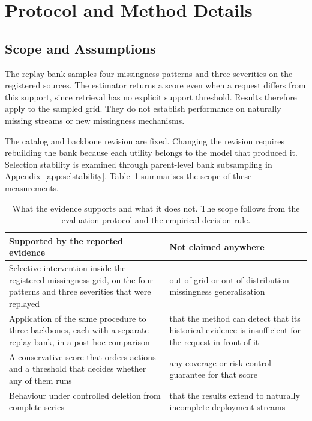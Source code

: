 \documentclass{article}
\begin{document}
\section{Protocol and Method Details}
\label{app:protocol}
\subsection{Scope and Assumptions}
\label{app:scope}
The replay bank samples four missingness patterns and three severities on the registered
sources. The estimator returns a score even when a request differs from this support, since
retrieval has no explicit support threshold. Results therefore apply to the sampled grid.
They do not establish performance on naturally missing streams or new missingness mechanisms.

The catalog and backbone revision are fixed. Changing the revision requires rebuilding the
bank because each utility belongs to the model that produced it. Selection stability is
examined through parent-level bank subsampling in Appendix~\ref{app:selstability}.
Table~\ref{tab:app-claims} summarises the scope of these measurements.

\begin{table}[htbp]
  \caption{What the evidence supports and what it does not. The scope follows from the evaluation protocol and the empirical decision rule.}
  \label{tab:app-claims}
  \centering
  \small
  \setlength{\tabcolsep}{4pt}
\begin{tabular}{@{}p{} p{}@{}}
    \toprule
    Supported by the reported evidence & Not claimed anywhere \\
    \midrule
    Selective intervention inside the registered missingness grid, on the four patterns and three severities that were replayed & out-of-grid or out-of-distribution missingness generalisation \\
    Application of the same procedure to three backbones, each with a separate replay bank, in a post-hoc comparison & that the method can detect that its historical evidence is insufficient for the request in front of it \\
    A conservative score that orders actions and a threshold that decides whether any of them runs & any coverage or risk-control guarantee for that score \\
    Behaviour under controlled deletion from complete series & that the results extend to naturally incomplete deployment streams \\
    \bottomrule
  \end{tabular}
\end{table}
\end{document}
